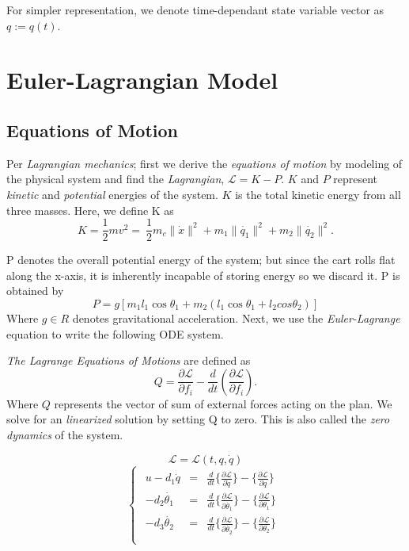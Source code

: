 \documentclass[journal]{IEEEtran}
\begin{document}
For simpler representation, we denote time-dependant state variable vector
as \(q:=q(t)\).


\section{Euler-Lagrangian Model}


\subsection{Equations of Motion}
Per \emph{Lagrangian mechanics}; first we derive the \emph{equations of motion}
by modeling of the physical system and find the \emph{Lagrangian}, \(\mathcal{L}= K -P\). \(K\) and \(P\) represent
\emph{kinetic} and \emph{potential} energies of the system. \(K\) is the total
kinetic energy from all three masses. Here, we define K as
\begin{equation}
    K = \frac{1}{2} m v^2 =~ \frac{1}{2} {m_c\|\dot{x}\|^2 + m_1\|\dot{q_1}\|^2 + m_2\|\dot{q_2}\|^2}.
\end{equation}

P denotes the overall potential energy of the system; but since the cart rolls
flat along the x-axis, it is inherently incapable of storing energy so we discard
it. P is obtained by
\begin{equation}
    P = g \left[ m_1 l_1 \cos \theta_1 + m_2 (l_1 \cos \theta_1 + l_2 cos \theta_2) \right]
\end{equation}
Where \(g \in R\) denotes gravitational acceleration.
Next, we use the \emph{Euler-Lagrange} equation to write the following ODE system.

\emph{The Lagrange Equations of Motions} are defined as
\begin{equation}
    Q = \frac{\partial\mathcal{L}}{\partial f_{i}} - \frac{d}{dt} \left( \frac{\partial \mathcal{L}}{\partial f_{i}}\right).
\end{equation}
Where \(Q\) represents the vector of sum of external forces acting on the plan.
We solve for an \emph{linearized} solution by setting Q to zero. This is also
called the \emph{zero dynamics} of the system.

\begin{equation}
    \mathcal{L} = \mathcal{L}(t, q, \dot{q})
\end{equation}
\begin{equation}
\begin{cases}
\begin{array}{rcl}
    u -d_1 \dot{q} &=& \frac{d}{dt} \{\frac{\partial\mathcal{L}}{\partial\dot{q}}\}-\{\frac{\partial\mathcal{L}}{\partial q}\}\\
    -d_2 \dot{\theta_1} &=& \frac{d}{dt} \{\frac{\partial\mathcal{L}}{\partial\dot{\theta_1}}\}-\{\frac{\partial\mathcal{L}}{\partial \theta_1}\}\\
    -d_3 \dot{\theta_2} &=& \frac{d}{dt} \{\frac{\partial\mathcal{L}}{\partial\dot{\theta_2}}\}-\{\frac{\partial\mathcal{L}}{\partial \theta_2}\}\\
    \end{array}
\end{cases}
\end{equation}
\end{document}
